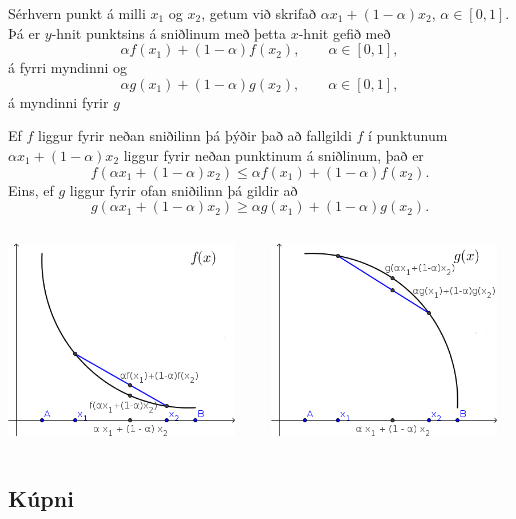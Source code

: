 \documentclass[icelandic,a4paper,12pt]{article}
\begin{document}
Sérhvern punkt á milli $x_1$ og $x_2$, getum við skrifað $\alpha x_1 + (1-\alpha)x_2$, $\alpha \in [0,1]$. Þá er $y$-hnit punktsins á sniðlinum með þetta $x$-hnit gefið með 
$$
	\alpha f(x_1) + (1-\alpha) f(x_2), \qquad \alpha \in [0,1],
$$
á fyrri myndinni og 
$$
	\alpha g(x_1) + (1-\alpha) g(x_2), \qquad \alpha \in [0,1],
$$
á myndinni fyrir $g$


Ef $f$ liggur fyrir neðan sniðilinn þá þýðir það að fallgildi $f$ í punktunum 
$\alpha x_1 + (1-\alpha)x_2$ liggur fyrir neðan punktinum á sniðlinum, það er
$$f(\alpha x_1+(1-\alpha)x_2)\leq \alpha f(x_1)+(1-\alpha)f(x_2).$$
Eins, ef $g$ liggur fyrir ofan sniðilinn þá gildir að
$$g(\alpha x_1+(1-\alpha)x_2)\geq \alpha g(x_1)+(1-\alpha)g(x_2).$$


\begin{columns}[c] %
\begin{column}{.5\textwidth}
\includegraphics[width=6cm,keepaspectratio=true]{./myndir/kafli05/01_f3.png}
\end{column}
\begin{column}{.5\textwidth}
\includegraphics[width=6cm,keepaspectratio=true]{./myndir/kafli05/01_g3.png}
\end{column}
\end{columns}

\subsection{Kúpni}
\end{document}
